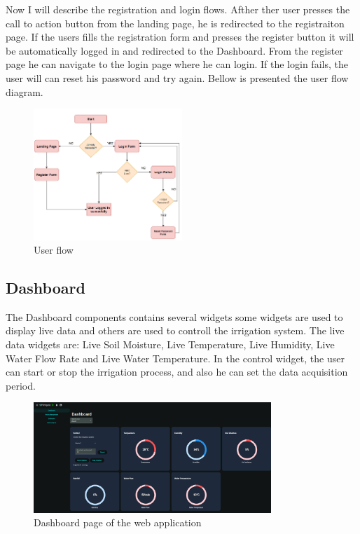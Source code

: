 Now I will describe the registration and login flows. Afther ther user presses the
call to action button from the landing page, he is redirected to the registraiton page. 
If the users fills the registration form and presses the register button it will be automatically
logged in and redirected to the Dashboard. From the register page he can navigate to the login page where
he can login. If the login fails, the user will can reset his password and try again.
Bellow is presented the user flow diagram.
\begin{figure}[H]
    \centering
    \includegraphics[width=0.5\textwidth]{images/user_flow.png}
    \caption{User flow}
    \label{fig:user-flow}
\end{figure}

\subsection{Dashboard}
The Dashboard components contains several widgets some widgets are used to display live data
and others are used to controll the irrigation system. 
The live data widgets are: Live Soil Moisture, Live Temperature, Live Humidity,
Live Water Flow Rate and Live Water Temperature. In the control widget, the user can
start or stop the irrigation process, and also he can set the data acquisition period.

\begin{figure}[H]
    \centering
    \includegraphics[width=0.8\textwidth]{images/dashboard.png}
    \caption{Dashboard page of the web application}
    \label{fig:dashboard-page}
\end{figure}

